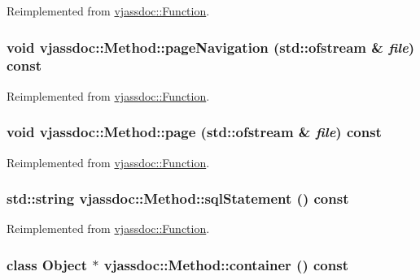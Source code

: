 Reimplemented from \hyperlink{classvjassdoc_1_1Function_031d74f7df7c29afb36626fd335b2037}{vjassdoc::Function}.\hypertarget{classvjassdoc_1_1Method_d5d61124a7d28d7e4680cc0df6cc5deb}{
\subsubsection{\setlength{\rightskip}{0pt plus 5cm}void vjassdoc::Method::pageNavigation (std::ofstream \& {\em file}) const}}
\label{classvjassdoc_1_1Method_d5d61124a7d28d7e4680cc0df6cc5deb}




Reimplemented from \hyperlink{classvjassdoc_1_1Function_b0776a1e111d7fcefbbcecd92f210a48}{vjassdoc::Function}.\hypertarget{classvjassdoc_1_1Method_564b24f8b05185ac9399dd36a9b0ad1a}{
\subsubsection{\setlength{\rightskip}{0pt plus 5cm}void vjassdoc::Method::page (std::ofstream \& {\em file}) const}}
\label{classvjassdoc_1_1Method_564b24f8b05185ac9399dd36a9b0ad1a}




Reimplemented from \hyperlink{classvjassdoc_1_1Function_7f32865b4c3f9f4c4e6379a437f5bdfe}{vjassdoc::Function}.\hypertarget{classvjassdoc_1_1Method_0a9c4b3b9cb2043eb1454ae72bbfe04f}{
\subsubsection{\setlength{\rightskip}{0pt plus 5cm}std::string vjassdoc::Method::sqlStatement () const}}
\label{classvjassdoc_1_1Method_0a9c4b3b9cb2043eb1454ae72bbfe04f}




Reimplemented from \hyperlink{classvjassdoc_1_1Function_7e4a84e1bb86ade42e6a95d81d8092a7}{vjassdoc::Function}.\hypertarget{classvjassdoc_1_1Method_647eb53622d1ef78100a97ef9eac9fe3}{
\subsubsection{\setlength{\rightskip}{0pt plus 5cm}class {\bf Object} $\ast$ vjassdoc::Method::container () const}}
\label{classvjassdoc_1_1Method_647eb53622d1ef78100a97ef9eac9fe3}




